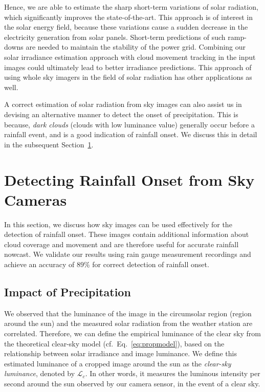 Hence, we are able to estimate the sharp short-term variations of solar radiation, which significantly improves the state-of-the-art. This approach is of interest in the solar energy field, because these variations cause a sudden decrease in the electricity generation from solar panels. Short-term predictions of such ramp-downs are needed to maintain the stability of the power grid. Combining our solar irradiance estimation approach with cloud movement tracking in the input images could ultimately lead to better irradiance predictions. This approach of using whole sky imagers in the field of solar radiation has other applications as well. 

A correct estimation of solar radiation from sky images can also assist us in devising an alternative manner to detect the onset of precipitation. This is because, \emph{dark clouds} (clouds with low luminance value) generally occur before a rainfall event, and is a good indication of rainfall onset. We discuss this in detail in the subsequent Section~\ref{sec:rainfallonset}. 

\section{Detecting Rainfall Onset from Sky Cameras}
\label{sec:rainfallonset}
In this section, we discuss how sky images can be used effectively for the detection of rainfall onset. These images contain additional information about cloud coverage and movement and are therefore useful for accurate rainfall nowcast. We validate our results using rain gauge measurement recordings and achieve an accuracy of $89$\% for correct detection of rainfall onset.  

\subsection{Impact of Precipitation}
We observed that the luminance of the image in the circumsolar region (region around the sun) and the measured solar radiation from the weather station are correlated. Therefore, we can define the empirical luminance of the clear sky from the theoretical clear-sky model (cf.\ Eq.~\ref{eq:propmodel}), based on the relationship between solar irradiance and image luminance. We define this estimated luminance of a cropped image around the sun as the \emph{clear-sky luminance}, denoted by $\mathcal{L}_c$. In other words, it measures the luminous intensity per second around the sun observed by our camera sensor, in the event of a clear sky.

